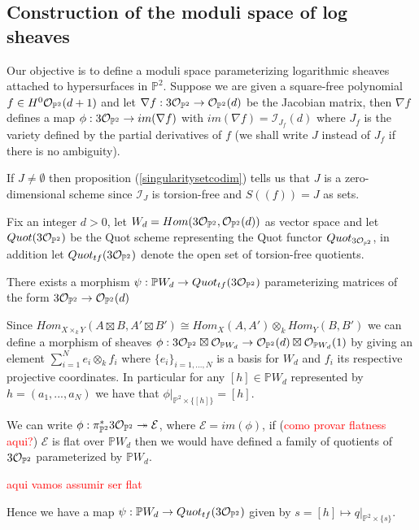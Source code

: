\subsection{Construction of the moduli space of log sheaves}
Our objective is to define a moduli space parameterizing logarithmic sheaves attached to hypersurfaces in $\mathbb{P}^2$. Suppose we are given a square-free polynomial $f \in H^0 \mathcal{O}_{\mathbb{P}^2}(d+1)$ and let $\nabla f: 3\mathcal{O}_{\mathbb{P}^2} \to \mathcal{O}_{\mathbb{P}^2}(d)$ be the Jacobian matrix, then $\nabla f$ defines a map $\phi:3\mathcal{O}_{\mathbb{P}^2} \to im(\nabla f)$ with $im(\nabla f) = \mathcal{I}_{J_{f}}(d)$ where $J_{f}$ is the variety defined by the partial derivatives of $f$ (we shall write $J$ instead of $J_{f}$ if there is no ambiguity).

\begin{remark}
If $J \not= \emptyset$ then proposition (\ref{singularitysetcodim}) tells us that $J$ is a zero-dimensional scheme since $\mathcal{I}_J$ is torsion-free and $S((f)) = J$ as sets.
\end{remark}

Fix an integer $d>0$, let $W_d = Hom(3\mathcal{O}_{\mathbb{P}^2},\mathcal{O}_{\mathbb{P}^2}(d))$ as vector space and let $Quot(3\mathcal{O}_{\mathbb{P}^2})$ be the Quot scheme representing the Quot functor $Quot_{3\mathcal{O}_{\mathbb{P}^2}}$, in addition let $Quot_{tf}(3\mathcal{O}_{\mathbb{P}^2})$ denote the open set of torsion-free quotients.

\begin{lemma}
There exists a morphism $\psi:\mathbb{P}W_d \to Quot_{tf}(3\mathcal{O}_{\mathbb{P}^2})$ parameterizing matrices of the form $3\mathcal{O}_{\mathbb{P}^2} \to \mathcal{O}_{\mathbb{P}^2}(d)$
\end{lemma}
\begin{dem*}
Since $Hom_{X \times_k Y}(A \boxtimes B , A' \boxtimes B') \cong Hom_X(A,A') \otimes_k Hom_Y(B,B')$ \cite[\href{https://stacks.math.columbia.edu/tag/0BEC}{Tag 0BEC}]{stacks-project} we can define a morphism of sheaves $\phi:3\mathcal{O}_{\mathbb{P}^2} \boxtimes \mathcal{O}_{\mathbb{P}W_d} \to \mathcal{O}_{\mathbb{P}^2}(d) \boxtimes \mathcal{O}_{\mathbb{P}W_d}(1)$ by giving an element $\sum_{i=1}^N e_i \otimes_k f_i$ where $\{e_i\}_{i=1,...,N}$ is a basis for $W_d$ and $f_i$ its respective projective coordinates. In particular for any $[h] \in \mathbb{P}W_d$ represented by $h = (a_1,...,a_N)$ we have that $\phi|_{\mathbb{P}^2 \times \{[h] \}} = [h]$.

We can write $\phi:\pi_{\mathbb{P}^2}^* 3\mathcal{O}_{\mathbb{P}^2} \twoheadrightarrow \mathcal{E}$, where $\mathcal{E} = im(\phi)$, if (\textcolor{red}{como provar flatness aqui?}) $\mathcal{E}$ is flat over $\mathbb{P}W_d$ then we would have defined a family of quotients of $3\mathcal{O}_{\mathbb{P}^2}$ parameterized by $\mathbb{P}W_d$.

\textcolor{red}{aqui vamos assumir ser flat}

Hence we have a map $\psi:\mathbb{P}W_d \to Quot_{tf}(3\mathcal{O}_{\mathbb{P}^2})$ given by $s=[h] \mapsto q|_{\mathbb{P}^2 \times \{s \}}$.
\end{dem*}

